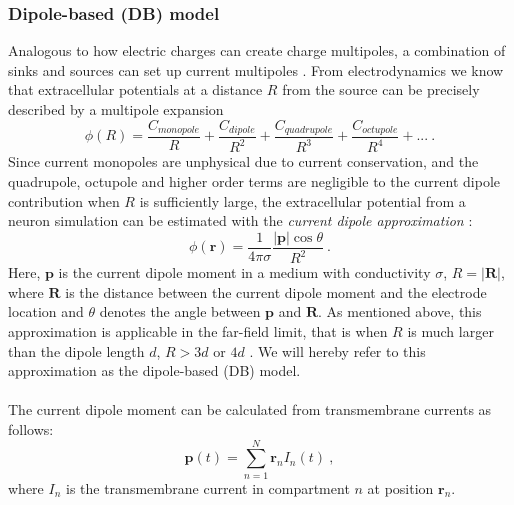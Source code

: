 \documentclass[preprint,10pt,authoryear]{elsarticle}
\begin{document}
\subsubsection{Dipole-based (DB) model}\label{subsec:cda}
Analogous to how electric charges can create charge multipoles, a combination of sinks and sources can set up current multipoles \citep{NUNEZ2006}. From electrodynamics we know that extracellular potentials at a distance $R$ from the source can be precisely described by a multipole expansion
\begin{equation*}
\phi(R) = \frac{C_{monopole}}{R} + \frac{C_{dipole}}{R^2} + \frac{C_{quadrupole}}{R^3} + \frac{C_{octupole}}{R^4} + ...~.
\end{equation*}
Since current monopoles are unphysical due to current conservation, and the quadrupole, octupole and higher order terms are negligible to the current dipole contribution when $R$ is sufficiently large, the extracellular potential from a neuron simulation can be estimated with the \textit{current dipole approximation} \citep{PETTERSEN&EINEVOLL2008,PETTERSEN2014,NUNEZ2006}:
\begin{equation}
\phi(\mathbf{r}) = \frac{1}{4 \pi \sigma} \frac{|\mathbf{p}| \cos \theta}{R^2}~.
\end{equation}
Here, $\mathbf{p}$ is the current dipole moment in a medium with conductivity $\sigma$, $R = |\mathbf{R}|$, where $\mathbf{R}$ is the distance between the current dipole moment and the electrode location and $\theta$ denotes the angle between $\mathbf{p}$ and $\mathbf{R}$. As mentioned above, this approximation is applicable in the far-field limit, that is when $R$ is much larger than the dipole length $d$, $R > 3d$ or $4d$ \citep{NUNEZ2006}. We will hereby refer to this approximation as the dipole-based (DB) model.
\\\\
The current dipole moment can be calculated from transmembrane currents as follows:
\begin{equation}\label{eq:dip_sum_trans}
\mathbf{p}(t) = \sum_{n = 1}^{N} \mathbf{r}_n I_n(t)~,
\end{equation}
where $I_n$ is the transmembrane current in compartment $n$ at position $\mathbf{r}_n$.
\end{document}
